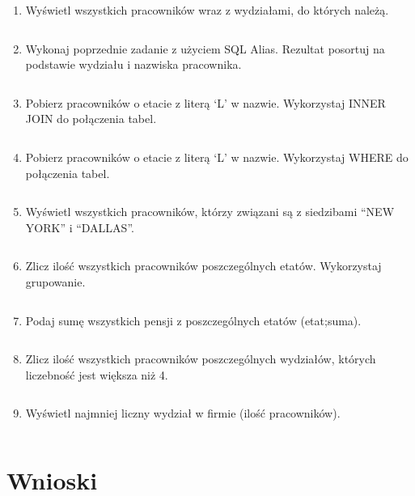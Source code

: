 \documentclass[a4paper, 10pt]{article}
\begin{document}
\begin{enumerate}
\item Wyświetl wszystkich pracowników wraz z wydziałami, do których należą.
\begin{lstlisting}[style=SQL]
\end{lstlisting}


\item Wykonaj poprzednie zadanie z użyciem SQL Alias. Rezultat posortuj na podstawie wydziału i nazwiska pracownika.  
\begin{lstlisting}[style=SQL]
\end{lstlisting}


\item Pobierz pracowników o etacie z literą `L' w nazwie. Wykorzystaj INNER JOIN do połączenia tabel. 
\begin{lstlisting}[style=SQL]
\end{lstlisting}


\item Pobierz pracowników o etacie z literą `L' w nazwie. Wykorzystaj WHERE do połączenia tabel. 
\begin{lstlisting}[style=SQL]
\end{lstlisting}


\item Wyświetl wszystkich pracowników, którzy związani są z siedzibami ``NEW YORK'' i ``DALLAS''. 
\begin{lstlisting}[style=SQL]
\end{lstlisting}


\item Zlicz ilość wszystkich pracowników poszczególnych etatów. Wykorzystaj grupowanie. 
\begin{lstlisting}[style=SQL]
\end{lstlisting}


\item Podaj sumę wszystkich pensji z poszczególnych etatów (etat;suma).
\begin{lstlisting}[style=SQL]
\end{lstlisting}


\item Zlicz ilość wszystkich pracowników poszczególnych wydziałów, których liczebność jest większa niż 4.  
\begin{lstlisting}[style=SQL]
\end{lstlisting}


\item Wyświetl najmniej liczny wydział w firmie (ilość pracowników).
\begin{lstlisting}[style=SQL]
\end{lstlisting}
\end{enumerate}


\section{Wnioski}
\end{document}
